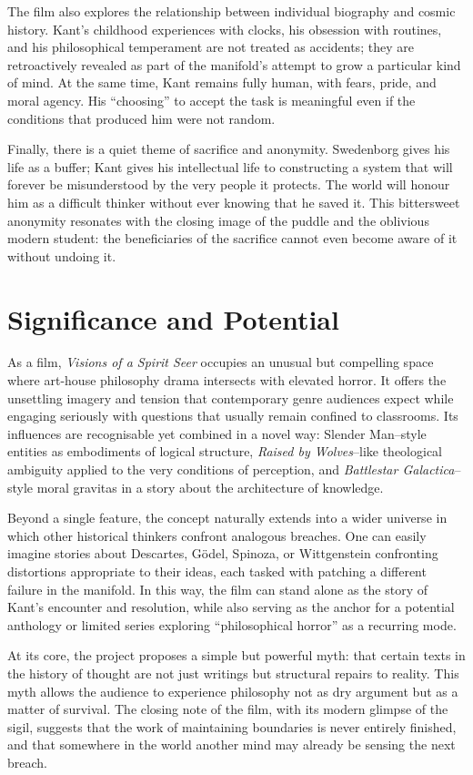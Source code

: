 \documentclass[12pt]{article}
\begin{document}
The film also explores the relationship between individual biography and cosmic history. Kant’s childhood experiences with clocks, his obsession with routines, and his philosophical temperament are not treated as accidents; they are retroactively revealed as part of the manifold’s attempt to grow a particular kind of mind. At the same time, Kant remains fully human, with fears, pride, and moral agency. His “choosing” to accept the task is meaningful even if the conditions that produced him were not random.

Finally, there is a quiet theme of sacrifice and anonymity. Swedenborg gives his life as a buffer; Kant gives his intellectual life to constructing a system that will forever be misunderstood by the very people it protects. The world will honour him as a difficult thinker without ever knowing that he saved it. This bittersweet anonymity resonates with the closing image of the puddle and the oblivious modern student: the beneficiaries of the sacrifice cannot even become aware of it without undoing it.

\section*{Significance and Potential}

As a film, \emph{Visions of a Spirit Seer} occupies an unusual but compelling space where art-house philosophy drama intersects with elevated horror. It offers the unsettling imagery and tension that contemporary genre audiences expect while engaging seriously with questions that usually remain confined to classrooms. Its influences are recognisable yet combined in a novel way: Slender Man–style entities as embodiments of logical structure, \emph{Raised by Wolves}–like theological ambiguity applied to the very conditions of perception, and \emph{Battlestar Galactica}–style moral gravitas in a story about the architecture of knowledge.

Beyond a single feature, the concept naturally extends into a wider universe in which other historical thinkers confront analogous breaches. One can easily imagine stories about Descartes, Gödel, Spinoza, or Wittgenstein confronting distortions appropriate to their ideas, each tasked with patching a different failure in the manifold. In this way, the film can stand alone as the story of Kant’s encounter and resolution, while also serving as the anchor for a potential anthology or limited series exploring “philosophical horror” as a recurring mode.

At its core, the project proposes a simple but powerful myth: that certain texts in the history of thought are not just writings but structural repairs to reality. This myth allows the audience to experience philosophy not as dry argument but as a matter of survival. The closing note of the film, with its modern glimpse of the sigil, suggests that the work of maintaining boundaries is never entirely finished, and that somewhere in the world another mind may already be sensing the next breach.
\end{document}
